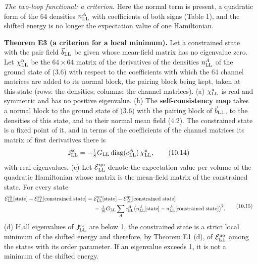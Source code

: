 \documentclass[
  10pt,
]{article}
\begin{document}
\emph{The two-loop functional: a criterion.} Here the normal term is
present, a quadratic form of the 64 densities \(n^A_{\rm LL}\) with
coefficients of both signs (Table 1), and the shifted energy is no
longer the expectation value of one Hamiltonian.

\textbf{Theorem E3 (a criterion for a local minimum).} Let a constrained
state with the pair field \(\vec b_{\rm LL}\) be given whose mean-field
matrix has no eigenvalue zero. Let \(\chi^{\rm n}_{\rm LL}\) be the
\(64\times64\) matrix of the derivatives of the densities
\(n^A_{\rm LL}\) of the ground state of (3.6) with respect to the
coefficients with which the 64 channel matrices are added to its normal
block, the pairing block being kept, taken at this state (rows: the
densities; columns: the channel matrices). (a) \(\chi^{\rm n}_{\rm LL}\)
is real and symmetric and has no positive eigenvalue. (b) The
\textbf{self-consistency map} takes a normal block to the ground state
of (3.6) with the pairing block of \(\vec b_{\rm LL}\), to the densities
of this state, and to their normal mean field (4.2). The constrained
state is a fixed point of it, and in terms of the coefficients of the
channel matrices its matrix of first derivatives there is
\[\mathsf J^{\rm sc}_{\rm LL}=-\tfrac18G_{\rm LL}\,\mathrm{diag}(c^A_{\rm LL})\,\chi^{\rm n}_{\rm LL},\tag{10.14}\]
with real eigenvalues. (c) Let \(\mathcal E^{\rm qu}_{\rm LL}\) denote
the expectation value per volume of the quadratic Hamiltonian whose
matrix is the mean-field matrix of the constrained state. For every
state
\[\begin{aligned}\mathcal E^{\rm sh}_{\rm LL}[\text{state}]-\mathcal E^{\rm sh}_{\rm LL}[\text{constrained state}]={}&\mathcal E^{\rm qu}_{\rm LL}[\text{state}]-\mathcal E^{\rm qu}_{\rm LL}[\text{constrained state}]\\
&-\tfrac1{16}G_{\rm LL}\sum_Ac^A_{\rm LL}\big(n^A_{\rm LL}[\text{state}]-n^A_{\rm LL}[\text{constrained state}]\big)^2.\end{aligned}\tag{10.15}\]
(d) If all eigenvalues of \(\mathsf J^{\rm sc}_{\rm LL}\) are below 1,
the constrained state is a strict local minimum of the shifted energy
and therefore, by Theorem E1 (d), of \(\mathcal E^{\rm no}_{\rm LL}\)
among the states with its order parameter. If an eigenvalue exceeds 1,
it is not a minimum of the shifted energy.
\end{document}

